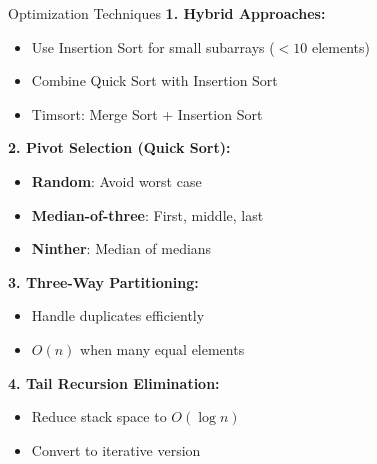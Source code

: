 \documentclass[aspectratio=169]{beamer}
\begin{document}
\begin{frame}{Optimization Techniques}
  \textbf{1. Hybrid Approaches:}
  \begin{itemize}
    \item Use Insertion Sort for small subarrays ($< 10$ elements)
    \item Combine Quick Sort with Insertion Sort
    \item Timsort: Merge Sort + Insertion Sort
  \end{itemize}

  \vspace{0.2cm}
  \textbf{2. Pivot Selection (Quick Sort):}
  \begin{itemize}
    \item \textbf{Random}: Avoid worst case
    \item \textbf{Median-of-three}: First, middle, last
    \item \textbf{Ninther}: Median of medians
  \end{itemize}

  \vspace{0.2cm}
  \textbf{3. Three-Way Partitioning:}
  \begin{itemize}
    \item Handle duplicates efficiently
    \item $O(n)$ when many equal elements
  \end{itemize}

  \vspace{0.2cm}
  \textbf{4. Tail Recursion Elimination:}
  \begin{itemize}
    \item Reduce stack space to $O(\log n)$
    \item Convert to iterative version
  \end{itemize}
\end{frame}
\end{document}
